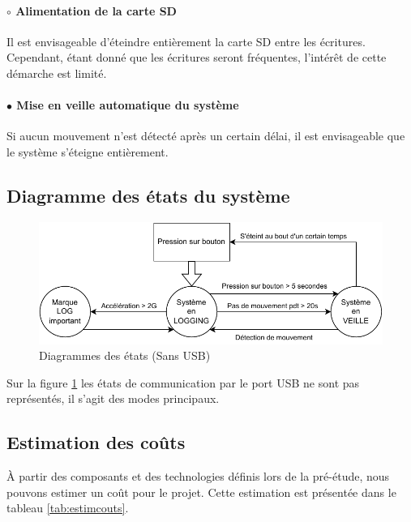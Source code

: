\paragraph{$\circ$ Alimentation de la carte SD} Il est envisageable d'éteindre entièrement la carte SD entre les écritures. Cependant, étant donné que les écritures seront fréquentes, l'intérêt de cette démarche est limité.

\paragraph{$\bullet$ Mise en veille automatique du système} Si aucun mouvement n'est détecté après un certain délai, il est envisageable que le système s'éteigne entièrement.

\subsection{Diagramme des états du système} 

\begin{figure}[h]
	\centering
	\includegraphics[width=0.8\linewidth]{../figures/pre_etude/Diagramme_Etat_Preetude}
	\caption{Diagrammes des états (Sans USB)}
	\label{fig:diagrammeetatpreetude}
\end{figure}

Sur la figure \ref{fig:diagrammeetatpreetude} les états de communication par le port USB ne sont pas représentés, il s'agit des modes principaux.


\clearpage

\subsection{Estimation des coûts} \label{ssec:Estimation-Couts}

À partir des composants et des technologies définis lors de la pré-étude, nous pouvons estimer un coût pour le projet. Cette estimation est présentée dans le tableau \ref{tab:estimcouts}.


